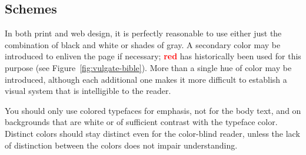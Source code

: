 \subsection{Schemes}
In both print and web design, it is perfectly reasonable to use either just the
combination of black and white or shades of gray. A secondary color may be
introduced to enliven the page if necessary; \textcolor{red}{\textbf{red}} has
historically been used for this purpose (see Figure~\ref{fig:vulgate-bible}).
More than a single hue of color may be introduced, although each additional one
makes it more difficult to establish a visual system that is intelligible to
the reader.

You should only use colored typefaces for emphasis, not for the body text, and
on backgrounds that are white or of sufficient contrast with the typeface
color. Distinct colors should stay distinct even for the color-blind reader,
unless the lack of distinction between the colors does not impair
understanding.
